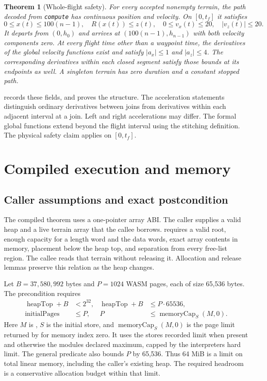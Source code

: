 \documentclass[11pt]{article}
\newtheorem{theorem}{Theorem}
\begin{document}
\begin{theorem}[Whole-flight safety]
For every accepted nonempty terrain, the path decoded from \textup{\texttt{compute}} has continuous position and velocity.  On $[0,t_f]$ it satisfies
\[
 0\leq x(t)\leq100(n-1),\quad R(x(t))\leq z(t),\quad
 0\leq v_x(t)\leq20,\quad |v_z(t)|\leq20.
\]
It departs from $(0,h_0)$ and arrives at $(100(n-1),h_{n-1})$ with both velocity components zero.  At every flight time other than a waypoint time, the derivatives of the global velocity functions exist and satisfy $|a_x|\leq1$ and $|a_z|\leq4$.  The corresponding derivatives within each closed segment satisfy those bounds at its endpoints as well.  A singleton terrain has zero duration and a constant stopped path.
\end{theorem}

 records these fields, and  proves the structure.  The acceleration statements distinguish ordinary derivatives between joins from derivatives within each adjacent interval at a join.  Left and right accelerations may differ.  The formal global functions extend beyond the flight interval using the stitching definition.  The physical safety claim applies on $[0,t_f]$.

\section{Compiled execution and memory}
\label{sec:execution}

\subsection{Caller assumptions and exact postcondition}

The compiled theorem uses a one-pointer array ABI.  The caller supplies a valid heap and a live terrain array that the callee borrows.   requires a valid root, enough capacity for a length word and the data words, exact array contents in memory, placement below the heap top, and separation from every free-list region.  The callee reads that terrain without releasing it.  Allocation and release lemmas preserve this relation as the heap changes.

Let $B=37{,}580{,}992$ bytes and $P=1024$ WASM pages, each of size 65,536 bytes.  The  precondition requires
\begin{align*}
 \operatorname{heapTop}+B&<2^{32},&
 \operatorname{heapTop}+B&\leq P\cdot65536,\\
 \operatorname{initialPages}&\leq P,&
 P&\leq\operatorname{memoryCap}_{S}(M,0).
\end{align*}
Here $M$ is , $S$ is the initial store, and $\operatorname{memoryCap}_{S}(M,0)$ is the page limit returned by  for memory index zero.  It uses the store\textquotesingle s recorded limit when present and otherwise the module\textquotesingle s declared maximum, capped by the interpreter\textquotesingle s hard limit.  The general predicate also bounds $P$ by 65,536.  Thus 64 MiB is a limit on total linear memory, including the caller's existing heap.  The required headroom is a conservative allocation budget within that limit.
\end{document}
